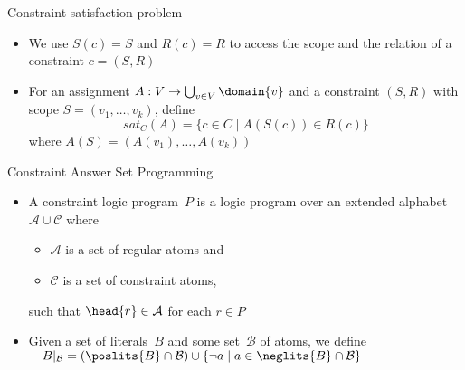 \newcommand{\scope}[1]{\ensuremath{\mathit{S}(#1)}}
\newcommand{\range}[1]{\ensuremath{\mathit{R}(#1)}}
\newcommand{\project}[2]{\ensuremath{{#1}|_{#2}}}
\newcommand{\abody}[1]{\project{\mathit{body}(#1)}{\mathcal{A}}} %
\newcommand{\cbody}[1]{\project{\mathit{body}(#1)}{\mathcal{C}}} %
\newcommand{\catom}[1]{\project{\atom{#1}}{\mathcal{C}}} %
\newcommand{\aatom}[1]{\project{\atom{#1}}{\mathcal{A}}}
\begin{frame}{Constraint satisfaction problem}
  \bigskip
  \begin{itemize}
  \item<1-> 
    We use $\scope{c}=S$ and $\range{c}=R$ to access the scope and the relation
    of a constraint $c=(S,R)$
    \medskip
  \item<2-> For an assignment
    \(
    A: V\to \bigcup_{v\in V}\domain{v}
    \)
    and a constraint $(S,R)$
    with scope
    \(
    S=(v_1,\dots,v_k)
    \),
    define
    \[
    \mathit{sat}_C(A)
    =
    \{
    c\in C \mid A(\scope{c}) \in \range{c}
    \}
    \]
    where
    \(
    A(S)
    =
    (A(v_1),\dots,A(v_k))
    \)
  \end{itemize}
\end{frame}
\begin{frame}{Constraint Answer Set Programming}
  \bigskip
  \begin{itemize}
  \item<1-> A \alert{constraint logic program}~$P$ is a logic program over an extended
    alphabet $\mathcal{A}\cup\mathcal{C}$
    where
    \begin{itemize}
    \item $\mathcal{A}$ is a set of \alert{regular atoms} and
    \item $\mathcal{C}$ is a set of \alert{constraint atoms},
    \end{itemize}
    such that $\head{r}\in\mathcal{A}$ for each $r\in P$
    \medskip
  \item<2-> Given a set of literals~$B$ and some set~$\mathcal{B}$ of atoms,
    we define
    \\\(\quad
    \project{B}{\mathcal{B}}
    =
    (\poslits{B}\cap\mathcal{B})
    \cup
    \{\neg a\mid a\in\neglits{B}\cap\mathcal{B}\}
    \)
  \end{itemize}
\end{frame}
